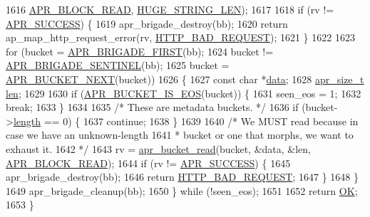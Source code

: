 \begin{DoxyCode}
1616                             \hyperlink{group__APR__Util__Bucket__Brigades_gga756973fb6392bd1026c3d96b4519776da2d983f5b7fd996434e0dded171c261d8}{APR\_BLOCK\_READ}, \hyperlink{group__APACHE__CORE__DAEMON_ga0c9dd98f46b90b5bcd4cbf75e252d0da}{HUGE\_STRING\_LEN});
1617 
1618         \textcolor{keywordflow}{if} (rv != \hyperlink{group__apr__errno_ga9ee311b7bf1c691dc521d721339ee2a6}{APR\_SUCCESS}) \{
1619             apr\_brigade\_destroy(bb);
1620             \textcolor{keywordflow}{return} ap\_map\_http\_request\_error(rv, \hyperlink{group__HTTP__Status_ga0c1fdbbb10800664989907cbd3a5a023}{HTTP\_BAD\_REQUEST});
1621         \}
1622 
1623         \textcolor{keywordflow}{for} (bucket = \hyperlink{group__APR__Util__Bucket__Brigades_gab5826a11eb6ba90786a94282f806c230}{APR\_BRIGADE\_FIRST}(bb);
1624              bucket != \hyperlink{group__APR__Util__Bucket__Brigades_ga858da66dccab1e063415678bb115788a}{APR\_BRIGADE\_SENTINEL}(bb);
1625              bucket = \hyperlink{group__APR__Util__Bucket__Brigades_ga7171f690b203d548a5b6ae0b079068d8}{APR\_BUCKET\_NEXT}(bucket))
1626         \{
1627             \textcolor{keyword}{const} \textcolor{keywordtype}{char} *\hyperlink{group__APACHE__CORE__LOG_gae4950db1dbfff8459a712737063b61aa}{data};
1628             \hyperlink{group__apr__platform_gaaa72b2253f6f3032cefea5712a27540e}{apr\_size\_t} \hyperlink{group__APACHE__CORE__LOG_gab5a43233d60ef05c5b5bf5cba3d74468}{len};
1629 
1630             \textcolor{keywordflow}{if} (\hyperlink{group__APR__Util__Bucket__Brigades_ga89b225e1c08473766eec719b985ca0d6}{APR\_BUCKET\_IS\_EOS}(bucket)) \{
1631                 seen\_eos = 1;
1632                 \textcolor{keywordflow}{break};
1633             \}
1634 
1635             \textcolor{comment}{/* These are metadata buckets. */}
1636             \textcolor{keywordflow}{if} (bucket->\hyperlink{structapr__bucket_a0898dfc78d9275187189b9a745e619bf}{length} == 0) \{
1637                 \textcolor{keywordflow}{continue};
1638             \}
1639 
1640             \textcolor{comment}{/* We MUST read because in case we have an unknown-length}
1641 \textcolor{comment}{             * bucket or one that morphs, we want to exhaust it.}
1642 \textcolor{comment}{             */}
1643             rv = \hyperlink{group__APR__Util__Bucket__Brigades_gae44ae938c6c60e148430fdb098dcf28f}{apr\_bucket\_read}(bucket, &data, &len, 
      \hyperlink{group__APR__Util__Bucket__Brigades_gga756973fb6392bd1026c3d96b4519776da2d983f5b7fd996434e0dded171c261d8}{APR\_BLOCK\_READ});
1644             \textcolor{keywordflow}{if} (rv != \hyperlink{group__apr__errno_ga9ee311b7bf1c691dc521d721339ee2a6}{APR\_SUCCESS}) \{
1645                 apr\_brigade\_destroy(bb);
1646                 \textcolor{keywordflow}{return} \hyperlink{group__HTTP__Status_ga0c1fdbbb10800664989907cbd3a5a023}{HTTP\_BAD\_REQUEST};
1647             \}
1648         \}
1649         apr\_brigade\_cleanup(bb);
1650     \} \textcolor{keywordflow}{while} (!seen\_eos);
1651 
1652     \textcolor{keywordflow}{return} \hyperlink{group__APACHE__CORE__DAEMON_gaba51915c87d64af47fb1cc59348961c9}{OK};
1653 \}
\end{DoxyCode}


